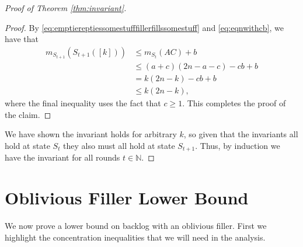 \documentclass[twocolumn]{article}[10pt]
\begin{document}
\begin{proof}[Proof of Theorem \ref{thm:invariant}]
\begin{proof}
By \eqref{eq:emptiereptiessomestufffillerfillssomestuff} and \eqref{eq:eqnwithcb}, we have that
\begin{align*}
    m_{S_{t+1}}(S_{t + 1}([k])) & \le m_{S_t}(AC) + b \\
                                & \le (a+c)(2n-a-c) - cb + b \\
                                & = k(2n-k) - cb + b \\
                                & \le k(2n-k),
\end{align*}
where the final inequality uses the fact that $c \ge 1$. This completes the proof of the claim. 
  
\end{proof}

We have shown the invariant holds for arbitrary $k$, so given that the
invariants all hold at state $S_t$ they also must all hold at state $S_{t+1}$.
Thus, by induction we have the invariant for all rounds $t\in\mathbb{N}$.
\end{proof}



\section{Oblivious Filler Lower Bound}\label{sec:oblivious}
We now prove a lower bound on backlog with an oblivious filler. First we
highlight the concentration inequalities that we will need in the analysis. 
\end{document}
